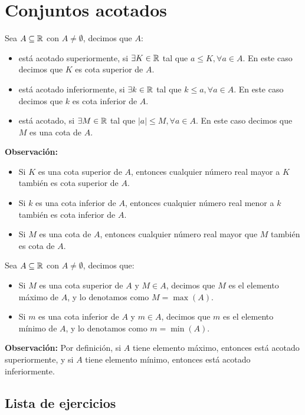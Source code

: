 \section*{Conjuntos acotados}

 Sea $A\subseteq \mathbb{R}$ con $A\neq \emptyset$, decimos que $A$:
\begin{itemize}
 \item está acotado superiormente, si $\exists K\in \mathbb{R}$ tal que $a \leq K, \forall a\in A$. En este caso decimos que $K$ es cota superior de $A$.

 \item está acotado inferiormente, si $\exists k\in \mathbb{R}$ tal que $k \leq a, \forall a\in A$. En este caso decimos que $k$ es cota inferior de $A$.

 \item está acotado, si $\exists M\in \mathbb{R}$ tal que $|a|\leq M,\forall a \in A$. En este caso decimos que $M$ es una cota de $A$.
\end{itemize}

\textbf{Observación:}
\begin{itemize}
  \item Si $K$ es una cota superior de $A$, entonces cualquier número real mayor a $K$ también es cota superior de $A$. 
  \item Si $k$ es una cota inferior de $A$, entonces cualquier número real menor a $k$ también es cota inferior de $A$.
  \item Si $M$ es una cota de $A$, entonces cualquier número real mayor que $M$ también es cota de $A$.
\end{itemize}

 Sea $A\subseteq \mathbb{R}$ con $A\neq \emptyset$, decimos que:
\begin{itemize}
  \item Si $M$ es una cota superior de $A$ y $M\in A$, decimos que $M$ es el elemento máximo de $A$, y lo denotamos como $M=\max(A)$.
  \item Si $m$ es una cota inferior de $A$ y $m\in A$, decimos que $m$ es el elemento mínimo de $A$, y lo denotamos como $m=\min(A)$.
\end{itemize}

\textbf{Observación:} Por definición, si $A$ tiene elemento máximo, entonces está acotado superiormente, y si $A$ tiene elemento mínimo, entonces está acotado inferiormente.

\subsection*{Lista de ejercicios}

